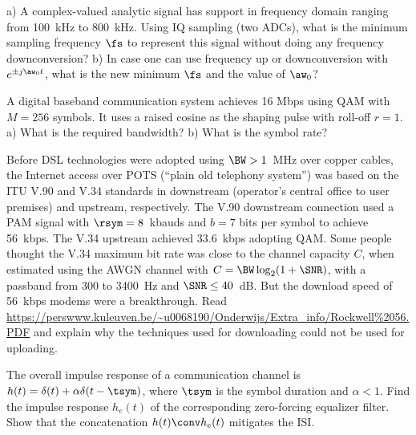 \begin{exercises}
\item a) A complex-valued analytic signal has support in frequency domain ranging from 100~kHz to 800~kHz. Using IQ sampling (two ADCs), what is the minimum sampling frequency $\fs$ to represent this signal without doing any frequency downconversion? b) In case one can use frequency up or downconversion with $e^{\pm j \aw_0 t}$, what is the new minimum $\fs$ and the value of $\aw_0$?

\item A digital baseband communication system achieves 16 Mbps using QAM with $M=256$ symbols. It uses a raised cosine as the shaping pulse with roll-off $r=1$. a) What is the required bandwidth? b) What is the symbol rate?

\item Before DSL technologies were adopted using $\BW > 1$~MHz over copper cables, the Internet access over POTS (``plain old telephony system'') was based on the ITU V.90 and V.34 standards in downstream (operator's central office to user premises) and upstream, respectively. The V.90 downstream connection used a PAM signal with $\rsym=8$~kbauds and $b=7$ bits per symbol to achieve 56~kbps. The V.34 upstream achieved 33.6~kbps adopting QAM. Some people thought the V.34 maximum bit rate was close to the channel capacity $C$, when estimated using the AWGN channel with $C=\BW \log_2 (1+\SNR)$, with a passband from 300 to 3400~Hz and $\SNR \le 40$~dB. But the download speed of 56~kbps modems were a breakthrough. Read 
\url{https://perswww.kuleuven.be/~u0068190/Onderwijs/Extra_info/Rockwell%2056.PDF}
and explain why the techniques used for downloading could not be used for uploading.

\item The overall impulse response of a communication channel is $h(t)=\delta(t) + \alpha \delta(t - \tsym)$, where $\tsym$ is the symbol duration and $\alpha < 1$. Find the impulse response $h_e(t)$ of the corresponding zero-forcing equalizer filter. Show that the concatenation $h(t) \conv h_e(t)$ mitigates the ISI.





\end{exercises}
